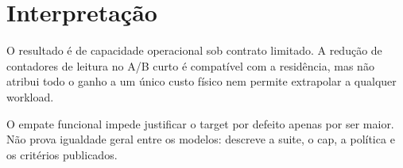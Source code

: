 \section{Interpretação}
O resultado é de capacidade operacional sob contrato limitado. A redução de contadores de leitura no A/B curto é compatível com a residência, mas não atribui todo o ganho a um único custo físico nem permite extrapolar a qualquer workload. 

O empate funcional impede justificar o target por defeito apenas por ser maior. Não prova igualdade geral entre os modelos: descreve a suite, o cap, a política e os critérios publicados. 
